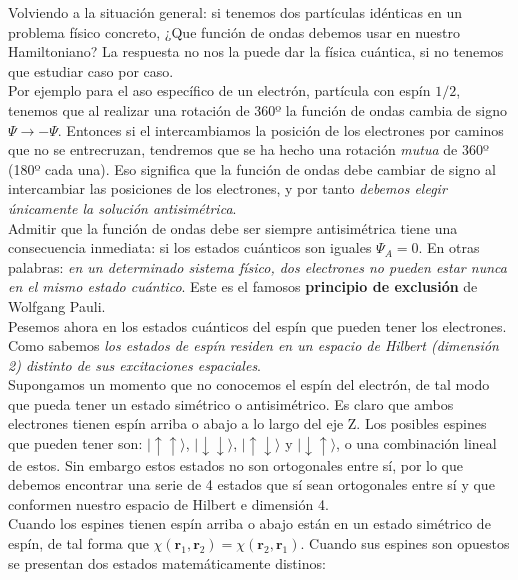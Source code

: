\documentclass[12pt]{article}
\newcommand{\rn}{\mathbf{r}}
\begin{document}
Volviendo a la situación general: si tenemos dos partículas idénticas en un problema físico concreto, ¿Que función de ondas debemos usar en nuestro Hamiltoniano? La respuesta no nos la puede dar la física cuántica, si no tenemos que estudiar caso por caso. \\

Por ejemplo para el aso específico de un electrón, partícula con espín $1/2$, tenemos que al realizar una rotación de 360º la función de ondas cambia de signo $\Psi \rightarrow - \Psi$. Entonces si el intercambiamos la posición de los electrones por caminos que no se entrecruzan, tendremos que se ha hecho una rotación \textit{mutua} de 360º (180º cada una).  Eso significa que la función de ondas debe cambiar de signo al intercambiar las posiciones de los electrones, y por tanto \textit{debemos elegir únicamente la solución antisimétrica}. \\

Admitir que la función de ondas debe ser siempre antisimétrica tiene una consecuencia inmediata: si los estados cuánticos son iguales $\Psi_A = 0$. En otras palabras: \textit{en un determinado sistema físico, dos electrones no pueden estar nunca en el mismo estado cuántico}. Este es el famosos \textbf{principio de exclusión} de Wolfgang Pauli. \\

Pesemos ahora en los estados cuánticos del espín que pueden tener los electrones. Como sabemos \textit{los estados de espín residen en un espacio de Hilbert (dimensión 2) distinto de sus excitaciones espaciales}. \\

Supongamos un momento que no conocemos el espín del electrón, de tal modo que pueda tener un estado simétrico o antisimétrico. Es claro que ambos electrones tienen espín arriba o abajo a lo largo del eje Z. Los posibles espines que pueden tener son:  $ \vert \uparrow \uparrow \rangle $, $\vert \downarrow \downarrow \rangle$, $\vert \uparrow \downarrow \rangle$ y $\vert \downarrow \uparrow \rangle$, o una combinación lineal de estos. Sin embargo estos estados no son ortogonales entre sí, por lo que debemos encontrar una serie de 4 estados que sí sean ortogonales entre sí y que conformen nuestro espacio de Hilbert e dimensión 4. \\

 Cuando los espines tienen espín arriba o abajo están en un estado simétrico de espín, de tal forma que $\chi (\rn_1,\rn_2) = \chi (\rn_2,\rn_1)$. Cuando sus espines son opuestos se presentan dos estados matemáticamente distinos:
\end{document}
